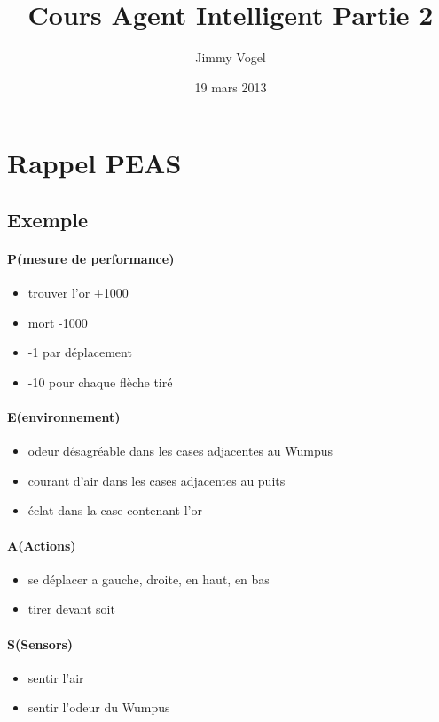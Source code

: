 \documentclass{article}
\title{ Cours Agent Intelligent Partie 2}
\author{Jimmy Vogel}
\date{19 mars 2013}
\begin{document}
\maketitle
\newpage
\tableofcontents
\newpage

\section{Rappel PEAS}
\subsection{Exemple}

\paragraph{P(mesure de performance)} 
\begin{itemize}
	\item trouver l'or +1000
	\item mort -1000
	\item -1 par déplacement
	\item -10 pour chaque flèche tiré
\end{itemize}
\paragraph{E(environnement)}
\begin{itemize}
	\item odeur désagréable dans les cases adjacentes au Wumpus
	\item courant d'air dans les cases adjacentes au puits
	\item éclat dans la case contenant l'or
\end{itemize}
\paragraph{A(Actions)}
\begin{itemize}
	\item se déplacer a gauche, droite, en haut, en bas
	\item tirer devant soit
\end{itemize}
\paragraph{S(Sensors)}
\begin{itemize}
	\item sentir l'air
	\item sentir l'odeur du Wumpus
\end{itemize}
\end{document}

